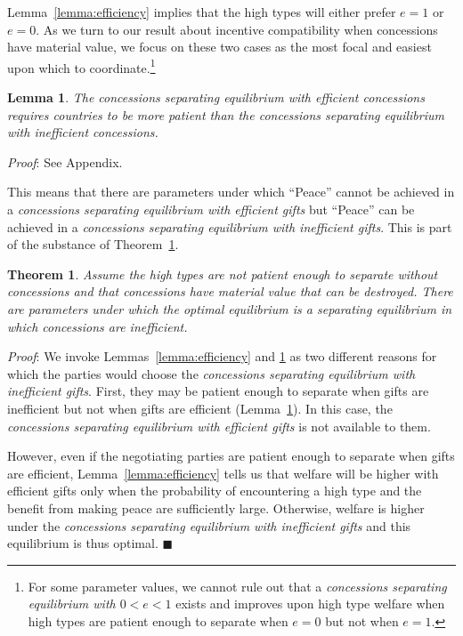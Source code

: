 \documentclass[12pt, letterpaper]{article}
\newtheorem{theorem}{Theorem}
\newtheorem{lemma}{Lemma}
\begin{document}
Lemma~\ref{lemma:efficiency} implies that the high types will either prefer $e=1$ or $e=0$. As we turn to our result about incentive compatibility when concessions have material value, we focus on these two cases as the most focal and easiest upon which to coordinate.\footnote{For some parameter values, we cannot rule out that a \emph{concessions separating equilibrium with $0<e<1$} exists and improves upon high type welfare when high types are patient enough to separate when $e=0$ but not when $e=1$.} %

\begin{lemma}
	The \emph{concessions separating equilibrium with efficient concessions} requires countries to be more patient than the \emph{concessions separating equilibrium with inefficient concessions}. 
	\label{lemma:e-patient}
\end{lemma}
\emph{Proof}: See Appendix.

This means that there are parameters under which ``Peace'' cannot be achieved in a \emph{concessions separating equilibrium with efficient gifts} but ``Peace'' can be achieved in a \emph{concessions separating equilibrium with inefficient gifts}. This is part of the substance of Theorem~\ref{theorem:4}. 

\begin{theorem}
		Assume the high types are not patient enough to separate without concessions and that concessions have material value that can be destroyed. There are parameters under which the optimal equilibrium is a separating equilibrium in which concessions are inefficient.
	\label{theorem:4}
\end{theorem}
\emph{Proof}: We invoke Lemmas~\ref{lemma:efficiency} and \ref{lemma:e-patient} as two different reasons for which the parties would choose the \emph{concessions separating equilibrium with inefficient gifts}. First, they may be patient enough to separate when gifts are inefficient but not when gifts are efficient (Lemma~\ref{lemma:e-patient}). In this case, the \emph{concessions separating equilibrium with efficient gifts} is not available to them.

However, even if the negotiating parties are patient enough to separate when gifts are efficient, Lemma~\ref{lemma:efficiency} tells us that welfare will be higher with efficient gifts only when the probability of encountering a high type and the benefit from making peace are sufficiently large. Otherwise, welfare is higher under the \emph{concessions separating equilibrium with inefficient gifts} and this equilibrium is thus optimal. \hfill $\blacksquare$\\
\end{document}
